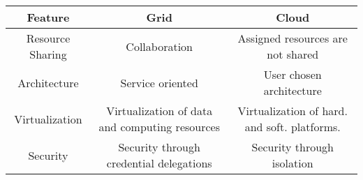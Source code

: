 \documentclass[paper=a4, fontsize=11pt]{scrartcl} %
\numberwithin{equation}{section} %
\numberwithin{figure}{section} %
\numberwithin{table}{section} %
\begin{document}
\begin{center}
\begin{adjustwidth}{-1.7cm}{}
\begin{tabular}{ | c | c | c | }
\hline
 \textbf{Feature} & \textbf{Grid} & \textbf{Cloud} \\ \hline
 Resource Sharing & Collaboration & Assigned resources are not shared \\  \hline
 Architecture & Service oriented &  User chosen architecture \\ \hline
 Virtualization & Virtualization of data
and computing resources & Virtualization of hard. and soft. platforms.  \\ \hline
 Security & Security through credential delegations & Security through isolation  \\ \hline
\end{tabular}
\end{adjustwidth}
\end{center}
\end{document}
